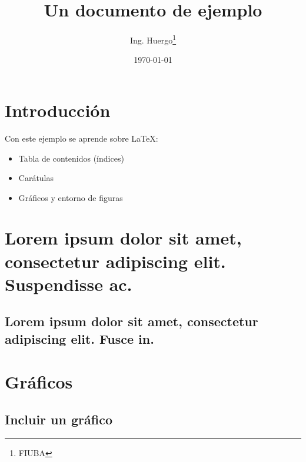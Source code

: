 \documentclass{article}
\begin{document}
\title{Un documento de ejemplo} %
\date{\today} %
\author{Ing. Huergo\thanks{FIUBA}} %

\maketitle %

\newpage %

\tableofcontents %

\listoffigures %

\listoftables %

\newpage %

\section*{Introducción}

Con este ejemplo se aprende sobre LaTeX:

\begin{itemize}
  \item Tabla de contenidos (índices)
  \item Carátulas
  \item Gráficos y entorno de figuras
\end{itemize}

\section{Lorem ipsum dolor sit amet, consectetur adipiscing elit. Suspendisse ac.}

\subsection[Fusce in]{Lorem ipsum dolor sit amet, consectetur adipiscing elit. Fusce in.}

\section{Gráficos}

\subsection{Incluir un gráfico}
\end{document}
